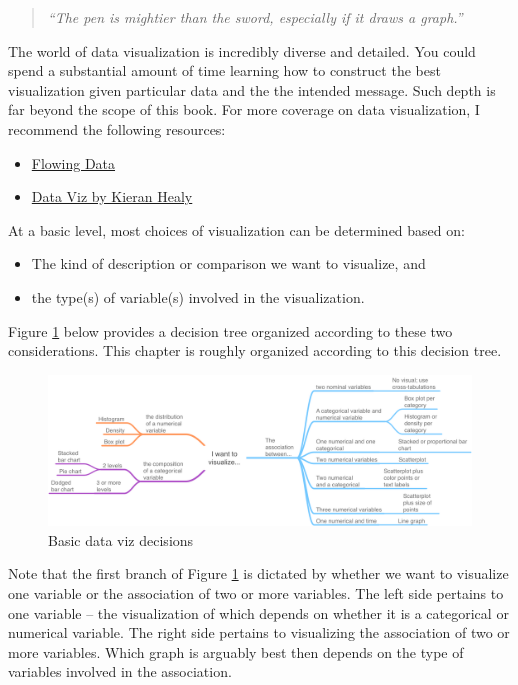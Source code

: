 \documentclass[
]{book}
\providecommand{\tightlist}{%
  \setlength{\itemsep}{0pt}\setlength{\parskip}{0pt}}
\begin{document}
\begin{quote}
\emph{``The pen is mightier than the sword, especially if it draws a graph.''}
\end{quote}

The world of data visualization is incredibly diverse and detailed. You could spend a substantial amount of time learning how to construct the best visualization given particular data and the the intended message. Such depth is far beyond the scope of this book. For more coverage on data visualization, I recommend the following resources:

\begin{itemize}
\tightlist
\item
  \href{https://flowingdata.com}{Flowing Data}
\item
  \href{https://socviz.co/index.html\#preface}{Data Viz by Kieran Healy}
\end{itemize}

At a basic level, most choices of visualization can be determined based on:

\begin{itemize}
\tightlist
\item
  The kind of description or comparison we want to visualize, and
\item
  the type(s) of variable(s) involved in the visualization.
\end{itemize}

Figure \ref{fig:vizflow} below provides a decision tree organized according to these two considerations. This chapter is roughly organized according to this decision tree.

\begin{figure}

{\centering \includegraphics[width=\textwidth]{images/vizflow2} 

}

\caption{Basic data viz decisions}\label{fig:vizflow}
\end{figure}

Note that the first branch of Figure \ref{fig:vizflow} is dictated by whether we want to visualize one variable or the association of two or more variables. The left side pertains to one variable -- the visualization of which depends on whether it is a categorical or numerical variable. The right side pertains to visualizing the association of two or more variables. Which graph is arguably best then depends on the type of variables involved in the association.
\end{document}
